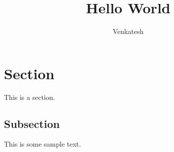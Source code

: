 \documentclass[12pt]{article}
\title{Hello World}
\author{Venkatesh}
\begin{document}
\maketitle
\section{Section}
This is a section.
\subsection{Subsection}
This is some sample text.
\end{document}
